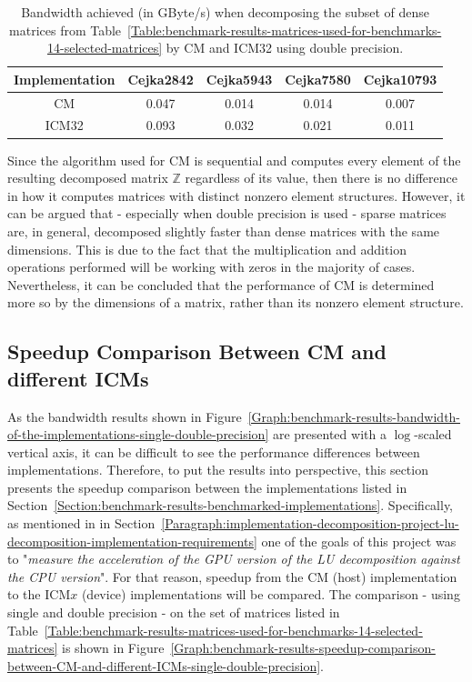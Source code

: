 \begin{table}[h!]
	\centering
	\renewcommand{\arraystretch}{1.5}
	\begin{tabular}{ |c|c|c|c|c| } 
		\hline
		Implementation & Cejka2842 & Cejka5943 & Cejka7580 & Cejka10793 \\
		\hline
		CM             &     0.047 &     0.014 &     0.014 & 0.007      \\
		\hline
		ICM32          &     0.093 &     0.032 &     0.021 & 0.011      \\
		\hline
	\end{tabular}
	\caption{Bandwidth achieved (in GByte/s) when decomposing the subset of dense matrices from Table~\ref{Table:benchmark-results-matrices-used-for-benchmarks-14-selected-matrices} by CM and ICM32 using double precision.}
	\label{Table:benchmark-results-bandwidth-of-the-implementations-dense-matrices-bandwidth}
\end{table}

Since the algorithm used for CM is sequential and computes every element of the resulting decomposed matrix $ \mathbb{Z} $ regardless of its value, then there is no difference in how it computes matrices with distinct nonzero element structures. However, it can be argued that - especially when double precision is used - sparse matrices are, in general, decomposed slightly faster than dense matrices with the same dimensions. This is due to the fact that the multiplication and addition operations performed will be working with zeros in the majority of cases. Nevertheless, it can be concluded that the performance of CM is determined more so by the dimensions of a matrix, rather than its nonzero element structure.


\subsection{Speedup Comparison Between CM and different ICMs \TO}\label{Subsection:benchmark-results-speedup-comparison-between-CM-and-different-ICMs}
As the bandwidth results shown in Figure~\ref{Graph:benchmark-results-bandwidth-of-the-implementations-single-double-precision} are presented with a $ \log $-scaled vertical axis, it can be difficult to see the performance differences between implementations. Therefore, to put the results into perspective, this section presents the speedup comparison between the implementations listed in Section~\ref{Section:benchmark-results-benchmarked-implementations}. Specifically, as mentioned in \textit{} in Section~\ref{Paragraph:implementation-decomposition-project-lu-decomposition-implementation-requirements} one of the goals of this project was to "\textit{measure the acceleration of the GPU version of the LU decomposition against the CPU version}". For that reason, speedup from the CM (host) implementation to the ICM$ x $ (device) implementations will be compared. The comparison - using single and double precision - on the set of matrices listed in Table~\ref{Table:benchmark-results-matrices-used-for-benchmarks-14-selected-matrices} is shown in Figure~\ref{Graph:benchmark-results-speedup-comparison-between-CM-and-different-ICMs-single-double-precision}.

